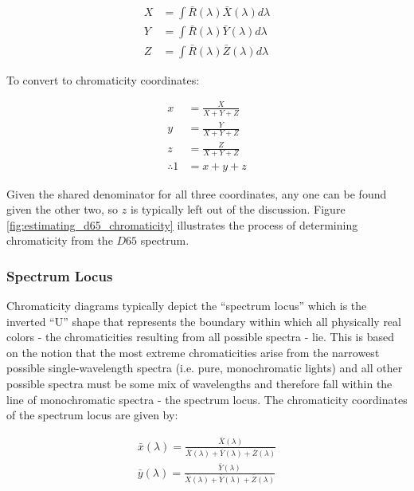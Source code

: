 \documentclass{article}
\begin{document}
\begin{multicols}{2}
\begin{equation}\label{eq:tristimulus_from_spectrum} %
    \begin{aligned}
        X&=\int\bar{R}(\lambda)\bar{X}(\lambda)d\lambda\\
        Y&=\int\bar{R}(\lambda)\bar{Y}(\lambda)d\lambda\\
        Z&=\int\bar{R}(\lambda)\bar{Z}(\lambda)d\lambda
    \end{aligned}
\end{equation}

To convert to chromaticity coordinates:

\begin{equation}\label{eq:chromaticity_from_tristimulus} %
    \begin{aligned}
        x&=\frac{X}{X+Y+Z}\\
        y&=\frac{Y}{X+Y+Z}\\
        z&=\frac{Z}{X+Y+Z}\\
        \therefore 1&=x+y+z
    \end{aligned}
\end{equation}

Given the shared denominator for all three coordinates, any one can be found given the other two, so $z$ is typically left out of the discussion.  Figure \ref{fig:estimating_d65_chromaticity} illustrates the process of determining chromaticity from the $D65$ spectrum.

\subsubsection{Spectrum Locus} %

Chromaticity diagrams typically depict the “spectrum locus” which is the inverted “U” shape that represents the boundary within which all physically real colors - the chromaticities resulting from all possible spectra - lie.  This is based on the notion that the most extreme chromaticities arise from the narrowest possible single-wavelength spectra (i.e. pure, monochromatic lights) and all other possible spectra must be some mix of wavelengths and therefore fall within the line of monochromatic spectra - the spectrum locus.  The chromaticity coordinates of the spectrum locus are given by:

\begin{equation} %
    \begin{aligned}
        \bar{x}(\lambda)=\frac{\bar{X}(\lambda)}{\bar{X}(\lambda)+\bar{Y}(\lambda)+\bar{Z}(\lambda)}\\
        \bar{y}(\lambda)=\frac{\bar{Y}(\lambda)}{\bar{X}(\lambda)+\bar{Y}(\lambda)+\bar{Z}(\lambda)}
    \end{aligned}
\end{equation}


\end{multicols}
\end{document}
